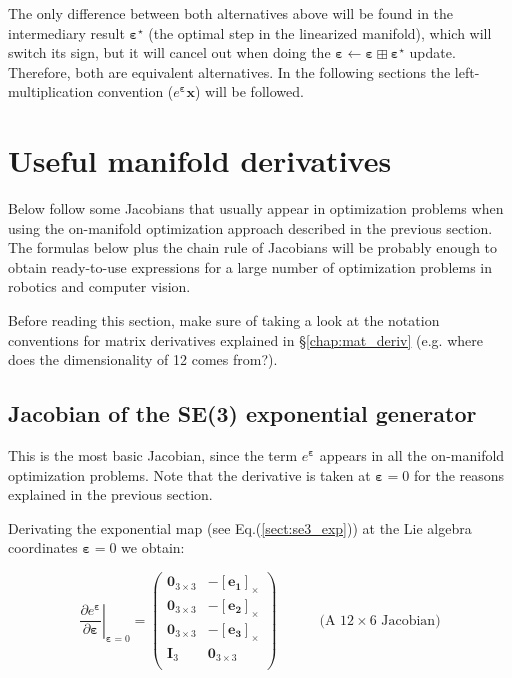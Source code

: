 \documentclass[a4paper,11pt]{report}
\newcommand{\E}{{\bm{\varepsilon}}}
\begin{document}
The only difference between both alternatives above
will be found in the intermediary result $\E^\star$ 
(the optimal step in the linearized manifold), 
which will switch its sign, but it will cancel out 
when doing the $\E \leftarrow \E \boxplus \E^\star$ update. 
Therefore, both are equivalent alternatives.
In the following sections the left-multiplication convention ($e^\E \mathbf{x}$) 
will be followed.


\section{Useful manifold derivatives}
\label{chap:se3_lie:deriv}

Below follow some Jacobians that usually appear in optimization problems 
when using the on-manifold optimization approach described in the previous section.
The formulas below plus the chain rule of Jacobians will be probably enough 
to obtain ready-to-use expressions for a large number of optimization problems
in robotics and computer vision.

Before reading this section, make sure of taking a look at the notation conventions
for matrix derivatives explained in \S\ref{chap:mat_deriv} 
(e.g. where does the dimensionality of 12 comes from?).


\subsection{Jacobian of the SE(3) exponential generator}
\label{sect:jacob_se3_gen}

This is the most basic Jacobian, since the term $e^\E$ appears in all 
the on-manifold optimization problems. 
Note that the derivative is taken at $\E=0$ for the reasons explained 
in the previous section.

Derivating the exponential map (see Eq.(\ref{sect:se3_exp})) at the Lie algebra
coordinates $\E=0$ we obtain:

\begin{equation}
\left. \frac{\partial e^\E}{\partial \E} \right|_{\E=0}
= 
\left(
\begin{array}{cc}
 \mathbf{0}_{3\times 3}  & -[\mathbf{e_1}]_\times \\
 \mathbf{0}_{3\times 3}  & -[\mathbf{e_2}]_\times \\
 \mathbf{0}_{3\times 3}  & -[\mathbf{e_3}]_\times \\
 \mathbf{I}_{3}  & \mathbf{0}_{3\times 3} \\
\end{array}
\right)
\quad\quad\quad \text{(A $12 \times 6$ Jacobian)}
\end{equation}
\end{document}
